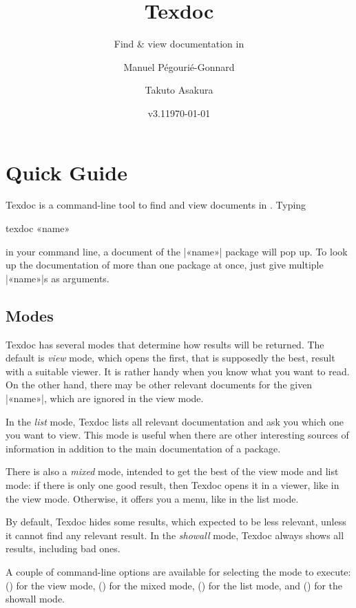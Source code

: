 \documentclass[draft]{texdoc-doc}
\title{Texdoc}
\subtitle{Find \& view documentation in \TL}
\author{Manuel Pégourié-Gonnard\and Takuto Asakura}
\date{v3.1\quad \today}
\begin{document}
\VerbatimFootnotes

\maketitle

\section{Quick Guide}

Texdoc is a command-line tool to find and view documents in {\TL}. Typing
%
\begin{htcode}
texdoc «name»
\end{htcode}
%
in your command line, a document of the |«name»| package will pop up. To look
up the documentation of more than one package at once, just give multiple
|«name»|s as arguments.

\subsection{Modes}
\label{sec:modes}

Texdoc has several modes that determine how results will be returned. The
default is \emph{view} mode, which opens the first, that is supposedly the
best, result with a suitable viewer. It is rather handy when you know what you
want to read. On the other hand, there may be other relevant documents for the
given |«name»|, which are ignored in the view mode.

In the \emph{list} mode, Texdoc lists all relevant documentation and ask you
which one you want to view. This mode is useful when there are other
interesting sources of information in addition to the main documentation of a
package.

There is also a \emph{mixed} mode, intended to get the best of the view mode
and list mode: if there is only one good result, then Texdoc opens it in a
viewer, like in the view mode. Otherwise, it offers you a menu, like in the
list mode.

By default, Texdoc hides some results, which expected to be less relevant,
unless it cannot find any relevant result. In the \emph{showall} mode, Texdoc
always shows all results, including bad ones.

A couple of command-line options are available for selecting the mode to
execute:  () for the view mode,  () for
the mixed mode,  () for the list mode, and 
() for the showall mode.
\end{document}
